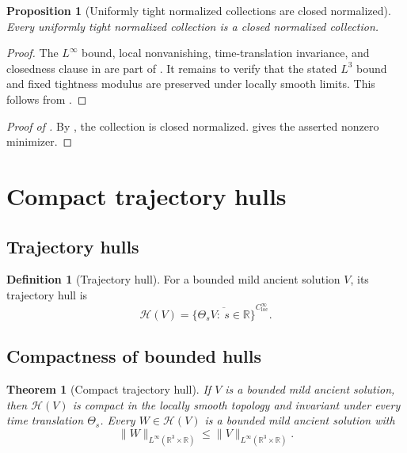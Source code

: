 \documentclass[11pt]{amsart}
\theoremstyle{plain}
\newtheorem{theorem}{Theorem}[section]
\newtheorem{proposition}[proposition]{Proposition}
\theoremstyle{definition}
\newtheorem{definition}[definition]{Definition}
\theoremstyle{remark}
\numberwithin{equation}{section}
\newcommand{\R}{\mathbb R}
\newcommand{\loc}{\mathrm{loc}}
\newcommand{\calH}{\mathcal H}
\begin{document}
\begin{proposition}[Uniformly tight normalized collections are closed normalized]
\label{p2:prop:tight-closed-normalized}
Every uniformly tight normalized collection is a closed normalized collection.
\end{proposition}

\begin{proof}
The \(L^\infty\) bound, local nonvanishing, time-translation invariance, and
closedness clause in  are part of
.  It remains to verify that the
stated \(L^3\) bound and fixed tightness modulus are
preserved under locally smooth limits.  This follows from
.
\end{proof}

\begin{proof}[Proof of ]
By , the collection is closed normalized.
 gives the asserted nonzero minimizer.
\end{proof}

\section{Compact trajectory hulls}
\label{p2:sec:compact-hulls}

\subsection{Trajectory hulls}

\begin{definition}[Trajectory hull]\label{p2:def:trajectory-hull}
For a bounded mild ancient solution \(V\), its trajectory hull is
\[
   \calH(V)
   =
   \overline{\{\Theta_sV:\ s\in\R\}}^{C^\infty_{\loc}}.
\]
\end{definition}

\subsection{Compactness of bounded hulls}

\begin{theorem}[Compact trajectory hull]\label{p2:thm:compact-hull}
If \(V\) is a bounded mild ancient solution, then \(\calH(V)\) is compact in
the locally smooth topology and invariant under every time translation
\(\Theta_s\).  Every \(W\in\calH(V)\) is a bounded mild ancient solution with
\[
   \|W\|_{L^\infty(\R^3\times\R)}
   \le
   \|V\|_{L^\infty(\R^3\times\R)}.
\]
\end{theorem}
\end{document}
